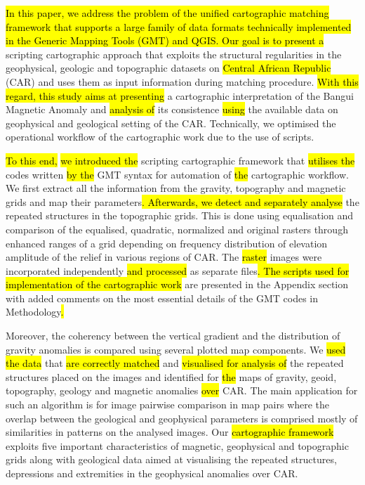 \documentclass[minerals,article,submit,pdftex,moreauthors]{Definitions/mdpi}
\begin{document}
\hl{In this paper, we address the problem of the unified cartographic matching framework that supports a large family of data formats technically implemented in the Generic Mapping Tools (GMT) and QGIS. Our goal is to present a }scripting cartographic approach\hl{ }that exploits the structural regularities in the geophysical, geologic and topographic datasets on \hl{Central African Republic }(CAR) and uses them as input information during\hl{ }matching procedure. \hl{With this regard, this study aims at presenting }a cartographic interpretation of the Bangui Magnetic Anomaly and \hl{analysis of} its consistence \hl{using} the available data on geophysical and geological setting of the CAR. Technically, we optimised the operational workflow of the cartographic work due to the use of scripts. 

\hl{To this end, }\hl{we introduced the }scripting cartographic framework that \hl{utilises the} codes written \hl{by the }GMT syntax for automation of \hl{the }cartographic workflow. We first extract all the information from the gravity, topography and magnetic grids and map their parameters\hl{. Afterwards, we detect and separately analyse }the repeated structures in the topographic grids. This is done using equalisation and comparison of the equalised, quadratic, normalized and original rasters through enhanced  ranges of a grid depending on frequency distribution of elevation amplitude of the relief in various regions of CAR. The \hl{raster }images were incorporated independently \hl{and processed }as separate files\hl{. The scripts used for implementation of the cartographic work} are presented in the Appendix section with added comments on the most essential details of the GMT codes in Methodology\hl{.}

Moreover, the coherency between the vertical gradient and the distribution of gravity anomalies is compared using\hl{ }several plotted map components. We \hl{used the data} that \hl{are correctly matched} and \hl{visualised for analysis of }the repeated structures placed on the images and identified for \hl{the }maps of gravity, geoid, topography, geology and magnetic anomalies \hl{over} CAR. The main application for such an algorithm is for image pairwise comparison in map pairs where the overlap between the geological and geophysical parameters is comprised mostly of similarities in patterns on the analysed images. Our \hl{cartographic framework} exploits five important characteristics of magnetic, geophysical and topographic grids along with geological data aimed at visualising the repeated structures, depressions and extremities in the geophysical anomalies over CAR. 
\end{document}
